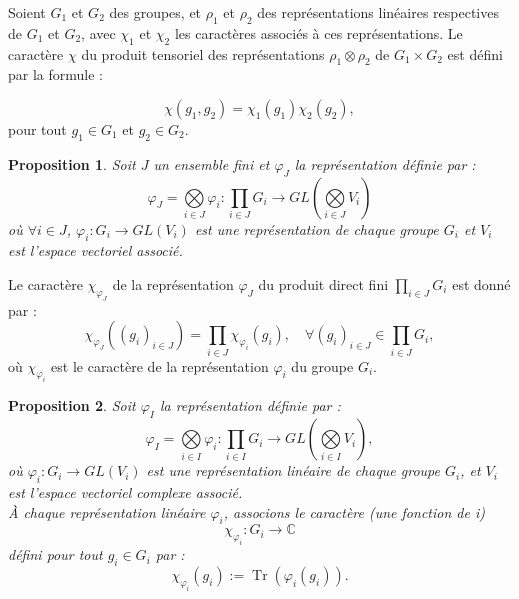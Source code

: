 \documentclass[9pt]{beamer}
\newtheorem{proposition}{Proposition}
\begin{document}
\begin{frame}
 	\begin{definition} 
 	Soient \( G_1 \) et \( G_2 \) des groupes, et \( \rho_1 \) et \( \rho_2 \) des représentations linéaires respectives de \( G_1 \) et \( G_2 \), avec \( \chi_1 \) et \( \chi_2 \) les caractères associés à ces représentations. Le caractère \( \chi \) du produit tensoriel des représentations \( \rho_1 \otimes \rho_2 \) de \( G_1 \times G_2 \) est défini par la formule :
 	
 	\[
 	\chi(g_1, g_2) = \chi_1(g_1) \chi_2(g_2),
 	\]
 	pour tout \( g_1 \in G_1 \) et \( g_2 \in G_2 \).
 \end{definition}
 
 \begin{proposition}
 	Soit $J$ un ensemble fini et  \( \varphi_J \) la représentation définie par :
 	\[
 	\varphi_{J} = \underset{i \in J}{\bigotimes} \varphi_i : \prod_{i \in J} G_i \longrightarrow GL\left( \underset{i \in J}{\bigotimes} V_i \right)
 	\]
 	où \(\forall i \in J\), \( \varphi_i : G_i \to GL(V_i) \) est une représentation de chaque groupe \( G_i \) et \( V_i \) est l'espace vectoriel associé.\\
 \end{proposition}	
 
\end{frame}

\begin{frame}

Le caractère $\chi_{\varphi_J}$ de la représentation $\varphi_J$ du produit direct fini $\underset{i\in J}\prod G_i$ est donné par :
\[
\chi_{\varphi_J}((g_i)_{i\in J}) = \prod_{i\in J} \chi_{\varphi_i}(g_i), \quad \forall (g_i)_{i\in J} \in \underset{i\in J}\prod G_i,
\]
où  $\chi_{\varphi_i}$ est le caractère de la représentation $\varphi_i$ du groupe $G_i$.

 \begin{proposition}
	Soit \( \varphi_I \) la représentation définie par :
	\[
	\varphi_I = \underset{i \in I}{\bigotimes} \varphi_i : \prod_{i \in I} G_i \longrightarrow GL\left( \underset{i \in I}{\bigotimes} V_i \right),
	\]
	où \( \varphi_i : G_i \to GL(V_i) \) est une représentation linéaire de chaque groupe \( G_i \), et \( V_i \) est l'espace vectoriel complexe associé.\\
	À chaque représentation linéaire \( \varphi_i \), associons le caractère (une fonction de i)
	\[
	\chi_{\varphi_i} : G_i \to \mathbb{C}
	\]
	défini pour tout \( g_i \in G_i \) par :
	\[
	\chi_{\varphi_i}(g_i) := \operatorname{Tr}(\varphi_i(g_i)).
	\]
\end{proposition}
\end{frame}
\end{document}

